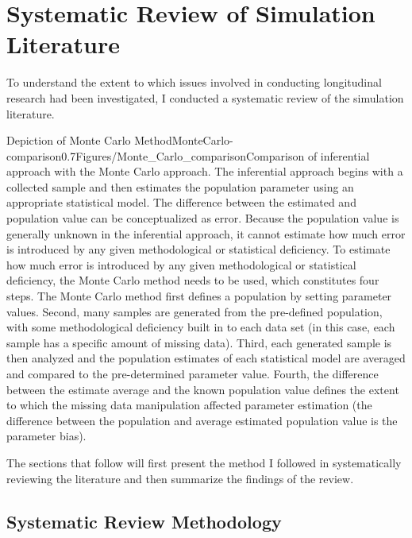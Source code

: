 \documentclass[
12pt, %
twoside,
english]{guelphthesis}
\begin{document}
\hypertarget{systematic-review-of-simulation-literature}{%
\section{Systematic Review of Simulation Literature}\label{systematic-review-of-simulation-literature}}

To understand the extent to which issues involved in conducting longitudinal research had been investigated, I conducted a systematic review of the simulation literature.
\begin{apaFigure}[landscape][samepage][0cm]{Depiction of Monte Carlo Method}{MonteCarlo-comparison}{0.7}{Figures/Monte_Carlo_comparison}{Comparison of inferential approach with the Monte Carlo approach. The inferential approach begins with a collected sample and then estimates the population parameter using an appropriate statistical model. The difference between the estimated and population value can be conceptualized as error. Because the population value is generally unknown in the inferential approach, it cannot estimate how much error is introduced by any given methodological or statistical deficiency. To estimate how much error is introduced by any given methodological or statistical deficiency, the Monte Carlo method needs to be used, which constitutes four steps. The Monte Carlo method first defines a population by setting parameter values. Second, many samples are generated from the pre-defined population, with some methodological deficiency built in to each data set (in this case, each sample has a specific amount of missing data). Third, each generated sample is then analyzed and the population estimates of each statistical model are averaged and compared to the pre-determined parameter value. Fourth, the difference between the estimate average and the known population value defines the extent to which the missing data manipulation affected parameter estimation (the difference between the population and average estimated population value is the parameter bias).}\end{apaFigure}

The sections that follow will first present the method I followed in systematically reviewing the literature and then summarize the findings of the review.

\hypertarget{systematic-review-methodology}{%
\subsection{Systematic Review Methodology}\label{systematic-review-methodology}}
\end{document}
